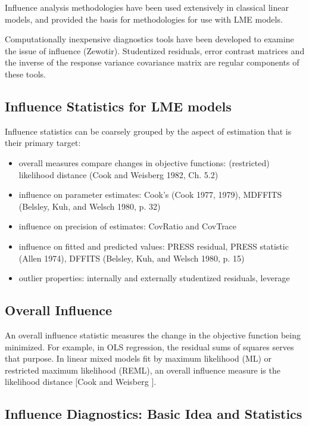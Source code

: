 \documentclass[00-MASTER.tex]{subfiles}
\begin{document}
	Influence analysis methodologies have been used extensively in classical linear models, and provided the basis for methodologies for use with LME models.
	
	Computationally inexpensive diagnostics tools have been developed to examine the issue of influence \citep{tewomir} (Zewotir).
	Studentized residuals, error contrast matrices and the inverse of the response variance covariance matrix are regular components of these tools.
	
	\subsection*{Influence Statistics for LME models} %
	Influence statistics can be coarsely grouped by the aspect of estimation that is their primary target:
	\begin{itemize}
		\item overall measures compare changes in objective functions: (restricted) likelihood distance (Cook and Weisberg 1982, Ch. 5.2)
		\item influence on parameter estimates: Cook's  (Cook 1977, 1979), MDFFITS (Belsley, Kuh, and Welsch 1980, p. 32)
		\item influence on precision of estimates: CovRatio and CovTrace
		\item influence on fitted and predicted values: PRESS residual, PRESS statistic (Allen 1974), DFFITS (Belsley, Kuh, and Welsch 1980, p. 15)
		\item outlier properties: internally and externally studentized residuals, leverage
	\end{itemize}

	
	\subsection{Overall Influence}
	An overall influence statistic measures the change in the objective function being minimized. For example, in
	OLS regression, the residual sums of squares serves that purpose. In linear mixed models fit by
	 maximum likelihood (ML) or  restricted maximum likelihood (REML), an overall influence measure is the  likelihood distance [Cook and Weisberg ].
	
	
	\subsection{Influence Diagnostics: Basic Idea and Statistics} %
	
\end{document}
